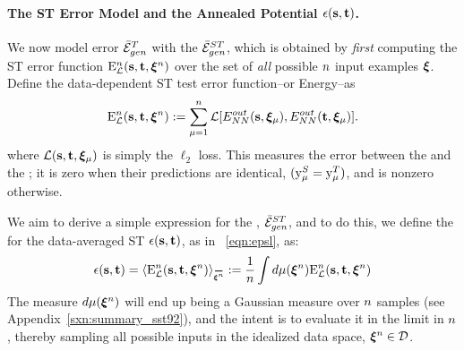 \paragraph{The ST Error Model and the Annealed Potential $\epsilon({\mathbf{s}}, {\mathbf{t}} )$.}
We now model \Teacher error $\bar{\mathcal{E}}_{gen}^{T}$ with the
\emph{\AverageSTGeneralizationError} $\bar{\mathcal{E}}^{ST}_{gen}$, which is obtained
 by \emph{first} computing the ST error function
${\mathrm{E}}^{n}_{\mathcal{L}}({\mathbf{s}},{\mathbf{t}},\boldsymbol{\xi}^{n})$
over the set of \emph{all} possible $n$ input examples $\boldsymbol{\xi}$.  Define the data-dependent ST test error function--or Energy--as 
\begin{align}
\label{eqn:DE_L}
{\mathrm{E}}^{n}_{\mathcal{L}}({\mathbf{s}},{\mathbf{t}},\boldsymbol{\xi}^{n}):=\sum_{\mu=1}^{n}\mathcal{L}[E^{out}_{NN}({\mathbf{s}},\boldsymbol{\xi}_{\mu}),E^{out}_{NN}({\mathbf{t}},\boldsymbol{\xi}_{\mu})]  .
\end{align}
where $\mathcal{L}({\mathbf{s}},{\mathbf{t}}, \boldsymbol{\xi}_{\mu})$ is simply the $\ell_2$ loss.  This measures the error
between the \Student and the \Teacher; it is zero when their predictions are identical,
$(\mathrm{y}_{\mu}^{S}=\mathrm{y}_{\mu}^{T})$,  and is nonzero otherwise.

We aim to derive a simple expression for the  \AverageSTGeneralizationError, $\bar{\mathcal{E}}^{ST}_{gen}$, and to do this, 
we define the  \EffectivePotential for the data-averaged ST \GeneralizationError $\epsilon({\mathbf{s}},{\mathbf{t}})$, as in \EQN~\ref{eqn:epsl}, as:
\begin{align}
\label{eqn:STerror}
\EPSLSTx = \langle\DETOPSTL\rangle_{\AVGNDXI}:=\frac{1}{\ND}\int d\mu(\NDXI)\DETOPSTL
\end{align}
The measure $d\mu(\boldsymbol{\xi}^{n})$ will end up being a Gaussian measure over $n$ samples
(see Appendix~\ref{sxn:summary_sst92}), and the intent is to evaluate it
in the \LargeN limit in $n$, thereby sampling all possible inputs in the idealized data space, $\boldsymbol{\xi}^{n}\in\mathcal{D}$.

